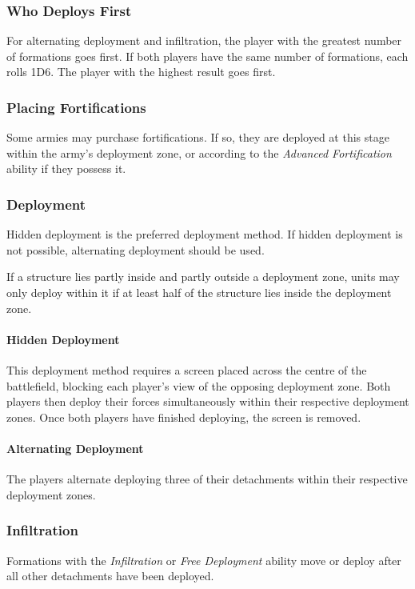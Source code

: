 \subsubsection{Who Deploys First}

For alternating deployment and infiltration, the player with the greatest number of formations goes first. If both players have the same number of formations, each rolls 1D6. The player with the highest result goes first.

\subsubsection{Placing Fortifications}

Some armies may purchase fortifications. If so, they are deployed at this stage within the army's deployment zone, or according to the \textit{Advanced Fortification} ability if they possess it.

\subsubsection{Deployment}

Hidden deployment is the preferred deployment method. If hidden deployment is not possible, alternating deployment should be used.

If a structure lies partly inside and partly outside a deployment zone, units may only deploy within it if at least half of the structure lies inside the deployment zone.

\paragraph{Hidden Deployment}

This deployment method requires a screen placed across the centre of the battlefield, blocking each player's view of the opposing deployment zone. Both players then deploy their forces simultaneously within their respective deployment zones. Once both players have finished deploying, the screen is removed.

\paragraph{Alternating Deployment}

The players alternate deploying three of their detachments within their respective deployment zones.

\subsubsection{Infiltration}

Formations with the \textit{Infiltration} or \textit{Free Deployment} ability move or deploy after all other detachments have been deployed.